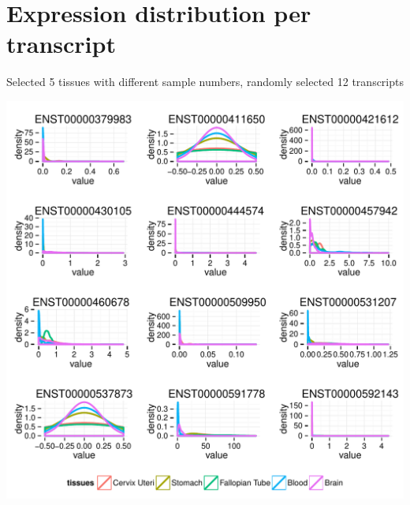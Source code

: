 \documentclass{article}\usepackage[]{graphicx}\usepackage[]{color}
\makeatletter
\def\maxwidth{ %
  \ifdim\Gin@nat@width>\linewidth
    \linewidth
  \else
    \Gin@nat@width
  \fi
}
\newenvironment{knitrout}{}{} %
\makeatother
\begin{document}
\newpage

\section{Expression distribution per transcript}

Selected 5 tissues with different sample numbers, randomly selected 12 transcripts

\begin{knitrout}
\color{fgcolor}
\includegraphics[width=\maxwidth]{figure/density_plot_example_transcripts-1} 

\end{knitrout}
\end{document}
